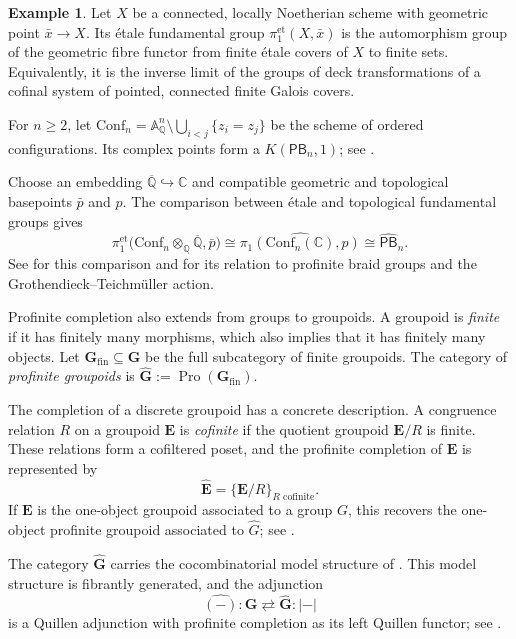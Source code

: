 \documentclass{amsart}
\newcommand{\bE}{\mathbf{E}}
\newcommand{\Grpd}{\mathbf{G}}
\newcommand{\Pro}{\operatorname{Pro}}
\newcommand{\PB}{\mathsf{PB}} %
\theoremstyle{definition}
\newtheorem{example}[theorem]{Example}%
\numberwithin{equation}{section}
\begin{document}
\begin{example}
\label{example: etale fundamental groups}
Let $X$ be a connected, locally Noetherian scheme with geometric
point $\bar x\to X$. Its étale fundamental group
$\pi_1^{\mathrm{et}}(X,\bar x)$ is the automorphism group of the
geometric fibre functor from finite étale covers of $X$ to finite
sets. Equivalently, it is the inverse limit of the groups of deck
transformations of a cofinal system of pointed, connected finite
Galois covers.

For $n\geq2$, let
$\mathrm{Conf}_n=\mathbb A_{\mathbb Q}^n
\setminus\bigcup_{i<j}\{z_i=z_j\}$ be the scheme of ordered
configurations. Its complex points form a $K(\PB_n,1)$; see
\cite{FadellNeuwirth}.

Choose an embedding
$\overline{\mathbb Q}\hookrightarrow\mathbb C$ and compatible
geometric and topological basepoints $\bar p$ and $p$. The comparison
between étale and topological fundamental groups gives
\[
\pi_1^{\mathrm{et}}
\bigl(
\mathrm{Conf}_n\otimes_{\mathbb Q}\overline{\mathbb Q},
\bar p
\bigr)
\cong
\widehat{\pi_1(\mathrm{Conf}_n(\mathbb C),p)}
\cong
\widehat{\PB}_n.
\]
See \cite[Exposé~XII, Corollaire~5.2]{SGA1} for this comparison and
\cite[Remark~1.14]{furusho_galois_2017} for its relation to
profinite braid groups and the Grothendieck--Teichmüller action.
\end{example}

Profinite completion also extends from groups to groupoids. A
groupoid is \emph{finite} if it has finitely many morphisms, which
also implies that it has finitely many objects. Let
$\Grpd_{\mathrm{fin}}\subseteq\Grpd$ be the full subcategory of
finite groupoids. The category of \emph{profinite groupoids} is
$\widehat{\Grpd}:=\Pro(\Grpd_{\mathrm{fin}})$.

The completion of a discrete groupoid has a concrete description. A
congruence relation $R$ on a groupoid $\bE$ is \emph{cofinite} if the
quotient groupoid $\bE/R$ is finite. These relations form a
cofiltered poset, and the profinite completion of $\bE$ is represented
by
\[
\widehat{\bE}
=
\{\bE/R\}_{R\text{ cofinite}}.
\]
If $\bE$ is the one-object groupoid associated to a group $G$, this
recovers the one-object profinite groupoid associated to $\widehat G$;
see \cite[Definitions~4.18--4.20]{Horel_profinite_groupoids}.

The category $\widehat{\Grpd}$ carries the cocombinatorial model
structure of
\cite[Theorem~4.12]{Horel_profinite_groupoids}. This model structure
is fibrantly generated, and the adjunction
\[
\widehat{(-)}\colon\Grpd
\rightleftarrows
\widehat{\Grpd}:|-|
\]
is a Quillen adjunction with profinite completion as its left Quillen
functor; see
\cite[Proposition~4.22]{Horel_profinite_groupoids}.
\end{document}
